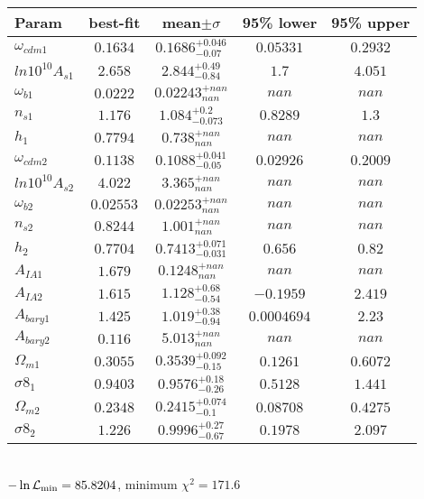 \begin{tabular}{|l|c|c|c|c|} 
 \hline 
Param & best-fit & mean$\pm\sigma$ & 95\% lower & 95\% upper \\ \hline 
$\omega_{cdm 1 }$ &$0.1634$ & $0.1686_{-0.07}^{+0.046}$ & $0.05331$ & $0.2932$ \\ 
$ln10^{10}A_{s 1 }$ &$2.658$ & $2.844_{-0.84}^{+0.49}$ & $1.7$ & $4.051$ \\ 
$\omega_{b 1 }$ &$0.0222$ & $0.02243_{nan}^{+nan}$ & $nan$ & $nan$ \\ 
$n_{s 1 }$ &$1.176$ & $1.084_{-0.073}^{+0.2}$ & $0.8289$ & $1.3$ \\ 
$h_{1 }$ &$0.7794$ & $0.738_{nan}^{+nan}$ & $nan$ & $nan$ \\ 
$\omega_{cdm 2 }$ &$0.1138$ & $0.1088_{-0.05}^{+0.041}$ & $0.02926$ & $0.2009$ \\ 
$ln10^{10}A_{s 2 }$ &$4.022$ & $3.365_{nan}^{+nan}$ & $nan$ & $nan$ \\ 
$\omega_{b 2 }$ &$0.02553$ & $0.02253_{nan}^{+nan}$ & $nan$ & $nan$ \\ 
$n_{s 2 }$ &$0.8244$ & $1.001_{nan}^{+nan}$ & $nan$ & $nan$ \\ 
$h_{2 }$ &$0.7704$ & $0.7413_{-0.031}^{+0.071}$ & $0.656$ & $0.82$ \\ 
$A_{IA 1 }$ &$1.679$ & $0.1248_{nan}^{+nan}$ & $nan$ & $nan$ \\ 
$A_{IA 2 }$ &$1.615$ & $1.128_{-0.54}^{+0.68}$ & $-0.1959$ & $2.419$ \\ 
$A_{bary 1 }$ &$1.425$ & $1.019_{-0.94}^{+0.38}$ & $0.0004694$ & $2.23$ \\ 
$A_{bary 2 }$ &$0.116$ & $5.013_{nan}^{+nan}$ & $nan$ & $nan$ \\ 
$\Omega_{m 1 }$ &$0.3055$ & $0.3539_{-0.15}^{+0.092}$ & $0.1261$ & $0.6072$ \\ 
$\sigma8_{1 }$ &$0.9403$ & $0.9576_{-0.26}^{+0.18}$ & $0.5128$ & $1.441$ \\ 
$\Omega_{m 2 }$ &$0.2348$ & $0.2415_{-0.1}^{+0.074}$ & $0.08708$ & $0.4275$ \\ 
$\sigma8_{2 }$ &$1.226$ & $0.9996_{-0.67}^{+0.27}$ & $0.1978$ & $2.097$ \\ 
\hline 
 \end{tabular} \\ 
$-\ln{\cal L}_\mathrm{min} =85.8204$, minimum $\chi^2=171.6$ \\ 
